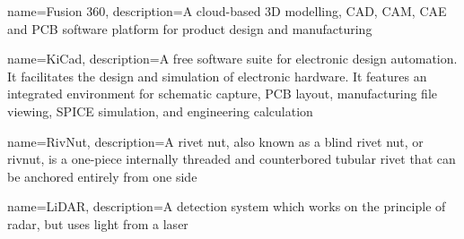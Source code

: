 {
	name=Fusion 360,
	description={A cloud-based 3D modelling, CAD, CAM, CAE and PCB software platform for product design and manufacturing}
}

{
	name=KiCad,
	description={A free software suite for electronic design automation. It facilitates the design and simulation of electronic hardware. It features an integrated environment for schematic capture, PCB layout, manufacturing file viewing, SPICE simulation, and engineering calculation}
}

{
	name=RivNut,
	description={A rivet nut, also known as a blind rivet nut, or rivnut, is a one-piece internally threaded and counterbored tubular rivet that can be anchored entirely from one side}
}

{
	name=LiDAR,
	description={A detection system which works on the principle of radar, but uses light from a laser}
}





